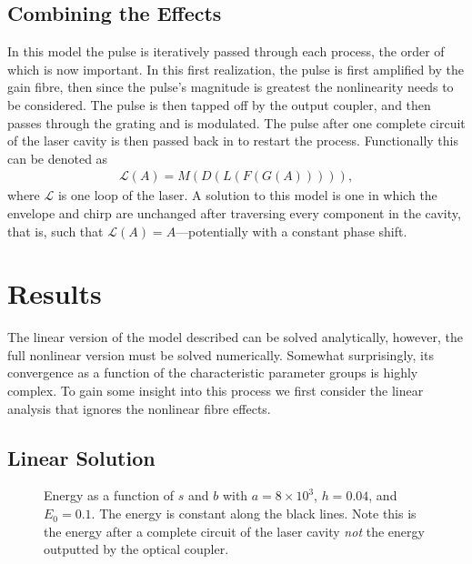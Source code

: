 \documentclass[%
 aps,
 jmp,%
 amsmath,amssymb,
 reprint,%
nofootinbib
]{revtex4-1}
\begin{document}
\subsection{Combining the Effects}
In this model the pulse is iteratively passed through each process, the order of which is now important. In this first realization, the pulse is first amplified by the gain fibre, then since the pulse's magnitude is greatest the nonlinearity needs to be considered. The pulse is then tapped off by the output coupler, and then passes through the grating and is modulated. The pulse after one complete circuit of the laser cavity is then passed back in to restart the process. Functionally this can be denoted as
\begin{align*}
	\mathcal{L}(A) = M(D(L(F(G(A))))),
\end{align*}
where $\mathcal{L}$ is one loop of the laser. A solution to this model is one in which the envelope and chirp are unchanged after traversing every component in the cavity, that is, such that $\mathcal{L}(A) = A$---potentially with a constant phase shift.

\section{Results}

The linear version of the model described can be solved analytically, however, the full nonlinear version must be solved numerically. Somewhat surprisingly, its convergence as a function of the characteristic parameter groups is highly complex. To gain some insight into this process we first consider the linear analysis that ignores the nonlinear fibre effects.

\subsection{Linear Solution}

\begin{figure}[tbp]
\vspace{-8mm}
\centering

\caption{Energy as a function of $s$ and $b$ with $a = 8 \times 10^3$, $h = 0.04$, and $E_0 = 0.1$. The energy is constant along the black lines. Note this is the energy after a complete circuit of the laser cavity \emph{not} the energy outputted by the optical coupler.}
\label{fig:energy}
\end{figure}
\end{document}
